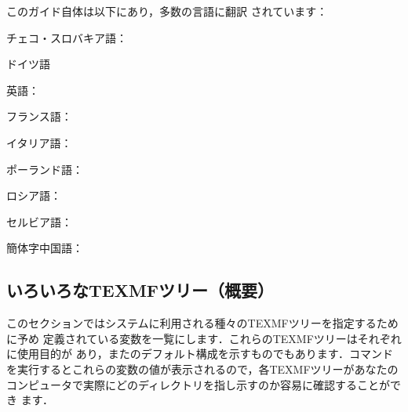 \documentclass[uplatex,dvipdfmx]{jsarticle}
\begin{document}
この\TL ガイド自体は以下にあり，多数の言語に翻訳
されています：

\begin{itemize*}
\item チェコ・スロバキア語：
\item ドイツ語
\item 英語：
\item フランス語：
\item イタリア語：
\item ポーランド語：
\item ロシア語：
\item セルビア語：
\item 簡体字中国語：
\end{itemize*}

\subsection{いろいろなTEXMFツリー（概要）}
\label{sec:texmftrees}

このセクションではシステムに利用される種々のTEXMFツリーを指定するために予め
定義されている変数を一覧にします．これらのTEXMFツリーはそれぞれに使用目的が
あり，また\TL のデフォルト構成を示すものでもあります．コマンドを実行するとこれらの変数の値が表示されるので，各TEXMFツリーがあなたの
コンピュータで実際にどのディレクトリを指し示すのか容易に確認することができ
ます．
\end{document}
